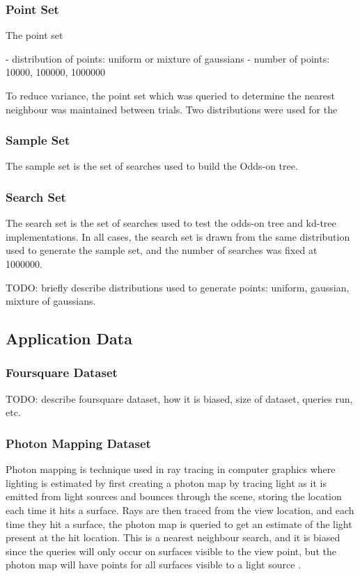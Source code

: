 \documentclass[mcs]{scsthesis}
\begin{document}
\subsubsection{Point Set}

The point set

- distribution of points: uniform or mixture of gaussians
- number of points: 10000, 100000, 1000000 

To reduce variance, the point set which was queried to determine the nearest
neighbour was maintained between trials.  Two distributions were used for the

\subsubsection{Sample Set}

The sample set is the set of searches used to build the Odds-on tree.

\subsubsection{Search Set}

The search set is the set of searches used to  test the odds-on tree and
kd-tree implementations.  In all cases, the search set is drawn from the same
distribution used to generate the sample set, and the number of searches was
fixed at 1000000. 

TODO: briefly describe distributions used to generate points: uniform, gaussian,
mixture of gaussians.

\subsection{Application Data}

\subsubsection{Foursquare Dataset}

TODO: describe foursquare dataset, how it is biased, size of dataset, queries
run, etc.

\subsubsection{Photon Mapping Dataset}

Photon mapping is technique used in ray tracing in computer graphics
where lighting is estimated by first creating a photon map by tracing light as
it is emitted from light sources and bounces through the scene, storing the
location each time it hits a surface.  Rays are then traced from the view
location, and each time they hit a surface, the photon map is queried to get an
estimate of the light present at the hit location.  This is a nearest neighbour
search, and it is biased since the queries will only occur on surfaces visible
to the view point, but the photon map will have points for all surfaces visible
to a light source \cite{physicallybased}.
\end{document}
